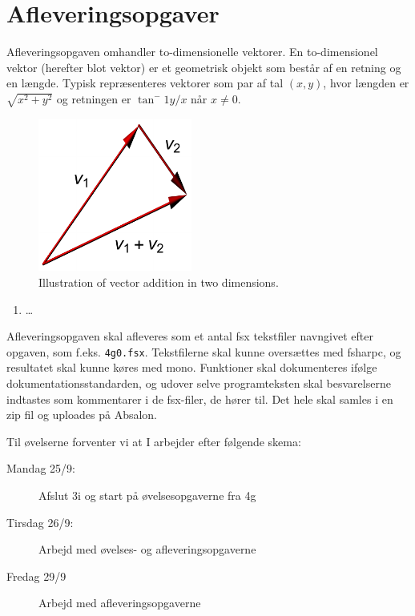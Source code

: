 \documentclass[a4paper,12pt]{article}
\begin{document}
\section*{Afleveringsopgaver}
Afleveringsopgaven omhandler to-dimensionelle vektorer. En to-dimensionel vektor (herefter blot vektor) er et geometrisk objekt som består af en retning og en længde. Typisk repræsenteres vektorer som par af tal $(x,y)$, hvor længden er $\sqrt{x^2+y^2}$ og retningen er $\tan^-1{y/x}$ når $x\neq 0$.

\begin{figure}
  \centering
  \includegraphics[width=0.45\textwidth]{vectorAddition}
  \caption{Illustration of vector addition in two dimensions.}
  \label{fig:vectorAddition}
\end{figure}

\begin{enumerate}[label=4g.\arabic*,start=0]
\item \dots
\end{enumerate}
Afleveringsopgaven skal afleveres som et antal fsx tekstfiler navngivet efter opgaven, som f.eks. \lstinline!4g0.fsx!. Tekstfilerne skal kunne oversættes med fsharpc, og resultatet skal kunne køres med mono. Funktioner skal dokumenteres ifølge dokumentationsstandarden, og udover selve programteksten skal besvarelserne indtastes som kommentarer i de fsx-filer, de hører til. Det hele skal samles i en zip fil og uploades på Absalon.

Til øvelserne forventer vi at I arbejder efter følgende skema:
\begin{description}
\item[Mandag 25/9:] Afslut 3i og start på øvelsesopgaverne fra 4g
\item[Tirsdag 26/9:] Arbejd med øvelses- og afleveringsopgaverne
\item[Fredag 29/9]  Arbejd med afleveringsopgaverne
\end{description}
\end{document}
